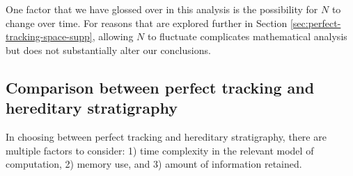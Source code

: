 One factor that we have glossed over in this analysis is the possibility for $N$ to change over time.
For reasons that are explored further in Section \ref{sec:perfect-tracking-space-supp}, allowing $N$ to fluctuate complicates mathematical analysis but does not substantially alter our conclusions.

\subsection{Comparison between perfect tracking and hereditary stratigraphy}

In choosing between perfect tracking and hereditary stratigraphy, there are multiple factors to consider: 1) time complexity in the relevant model of computation, 2) memory use, and 3) amount of information retained.

